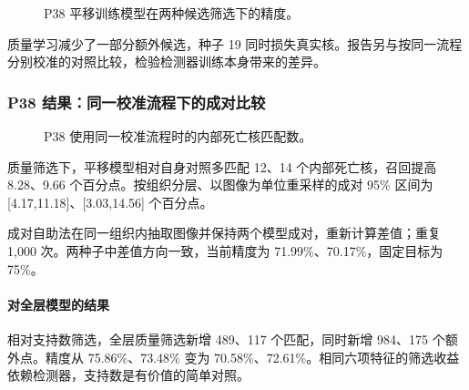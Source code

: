 \documentclass[
  12pt,
  fontset=fandol]{ctexart}
\begin{document}
\begin{figure}[H]\centering\caption{P38 平移训练模型在两种候选筛选下的精度。}\end{figure}
质量学习减少了一部分额外候选，种子 19 同时损失真实核。报告另与按同一流程分别校准的对照比较，检验检测器训练本身带来的差异。

\subsubsection{P38 结果：同一校准流程下的成对比较}\label{chapter36}
\begin{figure}[H]\centering\caption{P38 使用同一校准流程时的内部死亡核匹配数。}\end{figure}
质量筛选下，平移模型相对自身对照多匹配 12、14 个内部死亡核，召回提高 8.28、9.66 个百分点。按组织分层、以图像为单位重采样的成对 95\% 区间为 [4.17,11.18]、[3.03,14.56] 个百分点。

成对自助法在同一组织内抽取图像并保持两个模型成对，重新计算差值；重复 1,000 次。两种子中差值方向一致，当前精度为 71.99\%、70.17\%，固定目标为 75\%。

\paragraph{对全层模型的结果}
相对支持数筛选，全层质量筛选新增 489、117 个匹配，同时新增 984、175 个额外点。精度从 75.86\%、73.48\% 变为 70.58\%、72.61\%。相同六项特征的筛选收益依赖检测器，支持数是有价值的简单对照。
\end{document}
